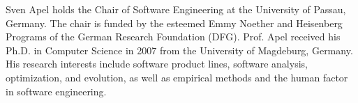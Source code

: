 \documentclass[10pt,journal,compsoc]{IEEEtran}
\begin{document}
\begin{IEEEbiography}
{Sven Apel} holds the Chair of Software Engineering at the University of Passau, Germany. The chair is funded by the esteemed Emmy Noether and Heisenberg Programs of the German Research Foundation (DFG). Prof. Apel received his Ph.D. in Computer Science in 2007 from the University of Magdeburg, Germany. His research interests include software product
lines, software analysis, optimization, and evolution, as well as
empirical methods and the human factor in software engineering.
\end{IEEEbiography}
\end{document}

